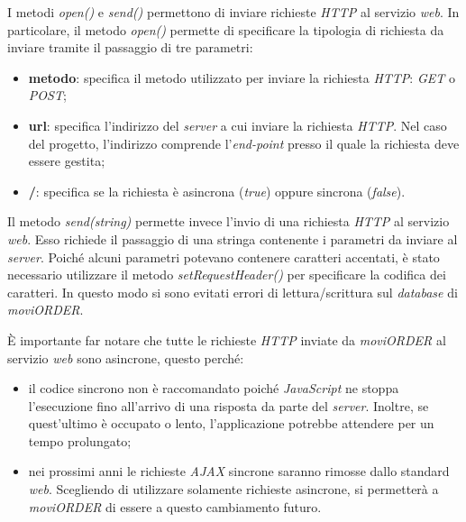 I metodi \textit{open()} e \textit{send()} permettono di inviare richieste \textit{HTTP} al servizio \textit{web}. In particolare, il metodo \textit{open()} permette di specificare la tipologia di richiesta da inviare tramite il passaggio di tre parametri:
	\begin{itemize}
		\item \textbf{metodo}: specifica il metodo utilizzato per inviare la richiesta \textit{HTTP}: \textit{GET} o \textit{POST};
		\item \textbf{url}: specifica l'indirizzo del \textit{server} a cui inviare la richiesta \textit{HTTP}. Nel caso del progetto, l'indirizzo comprende l'\textit{end-point} presso il quale la richiesta deve essere gestita;
		\item \textbf{/}: specifica se la richiesta è asincrona (\textit{true}) oppure sincrona (\textit{false}).
	\end{itemize}
Il metodo \textit{send(string)} permette invece l'invio di una richiesta \textit{HTTP} al servizio \textit{web}. Esso richiede il passaggio di una stringa contenente i parametri da inviare al \textit{server}. Poiché alcuni parametri potevano contenere caratteri accentati, è stato necessario utilizzare il metodo \textit{setRequestHeader()} per specificare la codifica dei caratteri. In questo modo si sono evitati errori di lettura/scrittura sul \textit{database} di \textit{moviORDER}. 

È importante far notare che tutte le richieste \textit{HTTP} inviate da \textit{moviORDER} al servizio \textit{web} sono asincrone, questo perché:
\begin{itemize}
	\item il codice sincrono non è raccomandato poiché \textit{JavaScript} ne stoppa l'esecuzione fino all'arrivo di una risposta da parte del \textit{server}. Inoltre, se quest'ultimo è occupato o lento, l'applicazione potrebbe attendere per un tempo prolungato;
	\item nei prossimi anni le richieste \textit{AJAX} sincrone saranno rimosse dallo standard \textit{web}. Scegliendo di utilizzare solamente richieste asincrone, si permetterà a \textit{moviORDER} di essere  a questo cambiamento futuro.
\end{itemize} 

